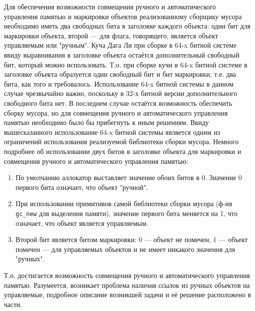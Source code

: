 Для обеспечения возможности совмещения ручного и автоматического управления памятью и маркировки объектов
реализованному сборщику мусора необходимо иметь два свободных бита в заголовке каждого объекта:
один бит для маркировки объекта, второй --- для флага, говорящего, является объект
управляемым или "ручным".
Куча Дага Ли при сборке в 64-x битной
системе ввиду выравнивания в заголовке объекта остаётся дополнительный свободный бит, который можно использовать.
Т.о. при сборке кучи в 64-x битной системе в заголовке объекта образуется один свободный бит
и бит маркировки, т.е. два бита, как того и требовалось.
Использование 64-x битной системы в данном случае чрезвычайно важно,
поскольку в 32-х битной версии дополнительного свободного бита нет. В последнем случае остаётся возможность
обеспечить сборку мусора, но для совмещения ручного и автоматического управления памятью необходимо было бы прибегнуть к
иным решениям. Ввиду вышесказанного использование 64-x битной системы является одним из ограничений
использования реализуемой библиотеки сборки мусора.
Немного подробнее об использовании двух битов в заголовке объекта для маркировки и совмещения ручного и автоматического
управления памятью:
\begin{enumerate}
\item По умолчанию аллокатор выставляет значение обоих битов в 0. Значение 0 первого бита означает, что объект "ручной".
\item При использовании примитивов самой библиотеки сборки мусора (ф-ия \lstinline[language= cpp]{gc_new} для выделения памяти),
	значение первого бита меняется на 1, что означает, что объект является управляемым.
\item Второй бит является битом маркировки: 0 --- объект не помечен, 1 --- объект помечен --- для управляемых
	объектов и не имеет никакого значения для "ручных".
\end{enumerate}
Т.о. достигается возможность совмещения ручного и автоматического управления памятью.
Разумеется, возникает проблема наличия ссылок из ручных объектов на управляемые,
подробное описание возникшей задачи и её решение расположено в части.

